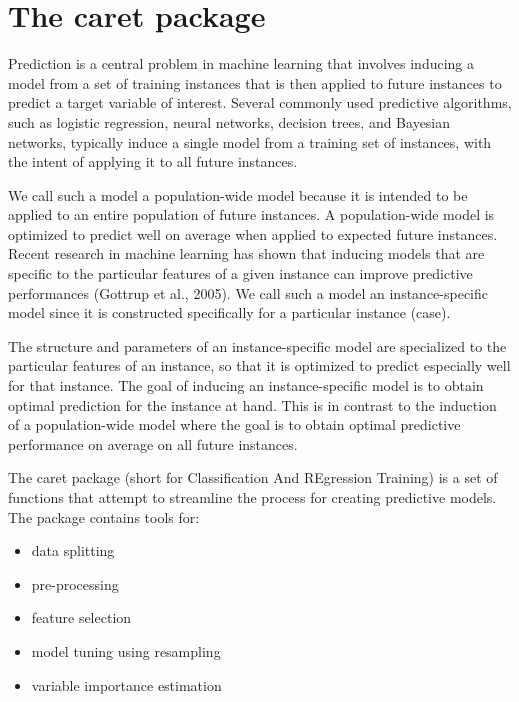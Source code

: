 \section{The caret package}

Prediction is a central problem in machine learning that involves inducing a model from a set of
training instances that is then applied to future instances to predict a target variable of interest.
Several commonly used predictive algorithms, such as logistic regression, neural networks, decision
trees, and Bayesian networks, typically induce a single model from a training set of instances, with
the intent of applying it to all future instances. 


We call such a model a population-wide model
because it is intended to be applied to an entire population of future instances. A population-wide
model is optimized to predict well on average when applied to expected future instances.
Recent research in machine learning has shown that inducing models that are speciﬁc to the
particular features of a given instance can improve predictive performances (Gottrup et al., 2005).
We call such a model an instance-speciﬁc model since it is constructed speciﬁcally for a particular
instance (case). 

The structure and parameters of an instance-speciﬁc model are specialized to the
particular features of an instance, so that it is optimized to predict especially well for that instance.
The goal of inducing an instance-speciﬁc model is to obtain optimal prediction for the instance at
hand. This is in contrast to the induction of a population-wide model where the goal is to obtain
optimal predictive performance on average on all future instances.


The caret package (short for Classification And REgression Training) is a set of functions that attempt to streamline the process for creating predictive models. The package contains tools for:

\begin{itemize}
\item data splitting
\item pre-processing
\item feature selection
\item model tuning using resampling
\item variable importance estimation
\end{itemize}


